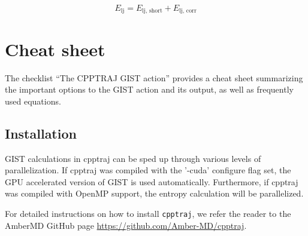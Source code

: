 \documentclass[9pt,tutorial]{livecoms}
\newcommand{\software}{\texttt}
\begin{document}
\begin{equation}
	E_\text{lj} = E_\text{lj,\ short} +  E_\text{lj,\ corr}
\end{equation}

\section{Cheat sheet}
The checklist ``The CPPTRAJ GIST action'' provides a cheat sheet summarizing the important options to the GIST action and its output, as well as frequently used equations.

\subsection{Installation}
GIST calculations in cpptraj can be sped up through various levels of 
parallelization.
If cpptraj was compiled with the '-cuda' configure flag set, the GPU accelerated version of GIST is used automatically. 
Furthermore, if cpptraj was compiled with OpenMP support, the entropy calculation will be parallelized.

For detailed instructions on how to install \software{cpptraj}, we refer the reader to the AmberMD GitHub page \url{https://github.com/Amber-MD/cpptraj}.
\end{document}
